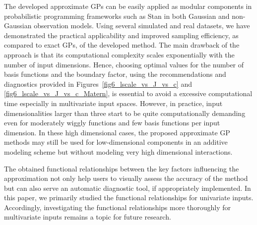 \documentclass[onecolumn,a4paper,11pt]{article}
\begin{document}
The developed approximate GPs can be easily applied as modular components in probabilistic programming frameworks such as Stan in both Gaussian and non-Gaussian observation models. Using several simulated and real datasets, we have demonstrated the practical applicability and improved sampling efficiency, as compared to exact GPs, of the developed method. The main drawback of the approach is that its computational complexity scales exponentially with the number of input dimensions. Hence, choosing optimal values for the number of basis functions and the boundary factor, using the recommendations and diagnostics provided in Figures~\ref{fig6_lscale_vs_J_vs_c} and \ref{fig6_lscale_vs_J_vs_c_Matern}, is essential to avoid a excessive computational time especially in multivariate input spaces. However, in practice, input dimensionalities larger than three start to be quite computationally demanding even for moderately wiggly functions and few basis functions per input dimension. In these high dimensional cases, the proposed approximate GP methods may still be used for low-dimensional components in an additive modeling scheme but without modeling very high dimensional interactions.

The obtained functional relationships between the key factors influencing the approximation not only help users to visually assess the accuracy of the method
but can also serve an automatic diagnostic tool, if appropriately implemented.
In this paper, we primarily studied the functional relationships for univariate inputs. Accordingly, investigating the functional relationships more thoroughly for multivariate inputs remains a topic for future research. 

\end{document}
